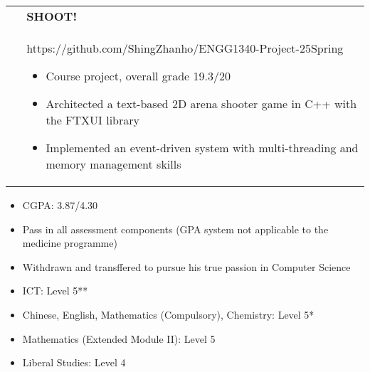 \documentclass[10pt,a4paper,withhypeper,normalphoto]{altacv}
\makeatletter
\newcommand{\cvachievementAlt}[3]{%
  \begin{tabularx}{\linewidth}{@{}p{2em} @{\hspace{1ex}} >{\raggedright\arraybackslash}X@{}}
  \multirow{2}{*}{\,\,\Large\color{accent}#1} & \bfseries\textcolor{emphasis}{#2}\\
  & #3
  \end{tabularx}%
  \smallskip
}
\makeatother
\begin{document}
\begin{paracol}{2}
\divider

\cvachievementAlt{\simpleicon{cplusplus}}{SHOOT!}{
https://github.com/ShingZhanho/ENGG1340-Project-25Spring
\begin{itemize}
  \item Course project, overall grade 19.3/20
  \item Architected a text-based 2D arena shooter game in C++ with the FTXUI library
  \item Implemented an event-driven system with multi-threading and memory management skills
\end{itemize}
}


\switchcolumn



\begin{itemize}
  \item CGPA: 3.87/4.30
\end{itemize}

\divider

\begin{itemize}
  \item Pass in all assessment components (GPA system not applicable to the medicine programme)
  \item Withdrawn and transffered to pursue his true passion in Computer Science
\end{itemize}

\divider

\begin{itemize}
  \item ICT: Level 5**
  \item Chinese, English, Mathematics (Compulsory),
  Chemistry: Level 5*
  \item Mathematics (Extended Module II): Level 5
  \item Liberal Studies: Level 4
\end{itemize}



\end{paracol}
\end{document}

